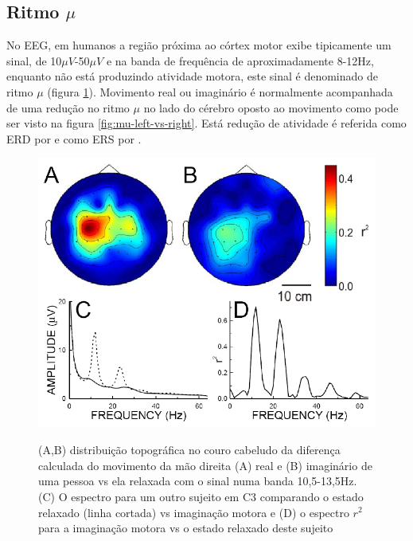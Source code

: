 \subsection{Ritmo $\mu$}
No \ac{EEG}, em humanos a regi\~ao pr\'oxima ao c\'ortex motor exibe tipicamente um sinal, de 10$\mu V$-50$\mu V$ e na banda de frequ\^encia de aproximadamente 8-12Hz, enquanto n\~ao est\'a produzindo atividade motora, este sinal \'e denominado de ritmo  $\mu$ (figura \ref{fig:Mu}).
Movimento real ou imagin\'ario \'e normalmente acompanhada de uma redu\c{c}\~ao no ritmo $\mu$ no lado do c\'erebro oposto ao movimento como pode ser visto na figura \ref{fig:mu-left-vs-right}.
Est\'a redu\c{c}\~ao de atividade \'e referida como \ac{ERD} por \cite{EOG2006} e como \ac{ERS} por \cite{Vidal77}.
\cite{BCI2000} \cite{RAO}
\begin{figure}[!ht]
	\begin{center}
		\caption{(A,B) distribui\c{c}\~ao topogr\'afica no couro cabeludo da diferen\c{c}a calculada do movimento da m\~ao direita (A) real e (B) imagin\'ario de uma pessoa vs ela relaxada com o sinal numa banda 10,5-13,5Hz. (C) O espectro  para um outro sujeito em C3 comparando o estado relaxado (linha cortada) vs imagina\c{c}\~ao motora e (D) o espectro $r^2$ para a imagina\c{c}\~ao motora vs o estado relaxado deste sujeito \cite{BCI2000}}
		\includegraphics[scale=0.35]{./figuras/ERDmu}
		\label{fig:Mu}
	\end{center}
\end{figure}
